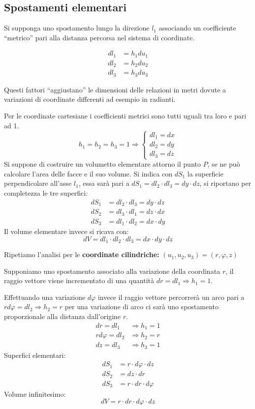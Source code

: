 \subsection{Spostamenti elementari}
Si supponga uno spostamento lungo la direzione $l_1$ associando un coefficiente ``metrico'' pari 
alla distanza percorsa nel sistema di coordinate.

\begin{align*}
dl_1 &= h_1 du_1 \\
dl_2 &= h_2 du_2 \\
dl_3 &= h_3 du_3
\end{align*}

Questi fattori ``aggiustano'' le dimensioni delle relazioni in metri dovute a variazioni di 
coordinate differenti ad esempio in radianti.

Per le coordinate cartesiane i coefficienti metrici sono tutti uguali tra loro e pari ad 1.
$$
h_1 = h_2 = h_3 = 1 \Rightarrow
\begin{cases}
dl_1 = dx \\
dl_2 = dy \\
dl_3 = dz
\end{cases}
$$
Si suppone di costruire un volumetto elementare attorno il punto $P$, se ne può calcolare
l'area delle facce e il suo volume.
Si indica con $dS_1$ la superficie perpendicolare all'asse $l_1$, essa sarà pari a 
$dS_1 = dl_2\cdot dl_3 = dy\cdot dz$, si riportano per completezza le tre superfici:
\begin{align*}
dS_1 &= dl_2\cdot dl_3 = dy\cdot dz \\
dS_2 &= dl_3\cdot dl_1 = dz\cdot dx \\
dS_3 &= dl_1\cdot dl_2 = dx\cdot dy
\end{align*}
Il volume elementare invece si ricava con:
$$
dV = dl_1\cdot dl_2 \cdot dl_3 = dx\cdot dy\cdot dz
$$

Ripetiamo l'analisi per le \textbf{coordinate cilindriche:}
$ (u_1,u_2,u_3) = (r,\varphi,z)$

Supponiamo uno spostamento associato alla variazione della coordinata $r$, il raggio vettore
viene incrementato di una quantità $dr = dl_1 \Rightarrow h_1 =1$.

Effettuando una variazione $d\varphi$ invece il raggio vettore percorrerà un arco pari 
a $rd\varphi = dl_2 \Rightarrow h_2 = r$ per una variazione di arco ci sarà uno 
spostamento proporzionale alla distanza dall'origine $r$.
\begin{align*}
dr = dl_1 &\Rightarrow h_1 = 1\\
r d\varphi = dl_2 &\Rightarrow h_2 = r \\
dz = dl_3 &\Rightarrow h_3 = 1
\end{align*}
Superfici elementari:
\begin{align*}
dS_1 &= r\cdot d\varphi\cdot dz\\
dS_2 &= dz\cdot dr\\
dS_3 &= r\cdot dr\cdot d\varphi
\end{align*}
Volume infinitesimo:
$$
dV = r\cdot dr\cdot d\varphi\cdot dz
$$

